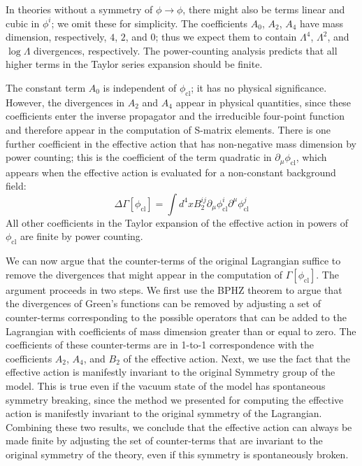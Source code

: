 In theories without a symmetry of $\phi \to \phi$, there might also be terms linear and cubic in $\phi^i$; we omit these for simplicity. The coefficients $A_0$, $A_2$, $A_4$ have mass dimension, respectively, $4$, $2$, and $0$; thus we expect them to contain $\Lambda^4$, $\Lambda^2$, and $\log \Lambda$ divergences, respectively. The power-counting analysis predicts that all higher terms in the Taylor series expansion should be finite.

The constant term $A_0$ is independent of $\phi_{\mathrm{cl}}$; it has no physical significance. However, the divergences in $A_2$ and $A_4$ appear in physical quantities, since these coefficients enter the inverse propagator and the irreducible four-point function and therefore appear in the computation of S-matrix elements. There is one further coefficient in the effective action that has non-negative mass dimension by power counting; this is the coefficient of the term quadratic in $\partial_{\mu} \phi_{\mathrm{cl}}$, which appears when the effective action is evaluated for a non-constant background field:
\[\Delta \Gamma [\phi_{\mathrm{cl}}] = \int d^4x B_2^{ij} \partial_{\mu} \phi_{\mathrm{cl}}^i \partial^{\mu} \phi_{\mathrm{cl}}^j\]
All other coefficients in the Taylor expansion of the effective action in powers of $\phi_{\mathrm{cl}}$ are finite by power counting.

We can now argue that the counter-terms of the original Lagrangian suffice to remove the divergences that might appear in the computation of $\Gamma[\phi_{\mathrm{cl}}]$. The argument proceeds in two steps. We first use the BPHZ theorem to argue that the divergences of Green's functions can be removed by adjusting a set of counter-terms corresponding to the possible operators that can be added to the Lagrangian with coefficients of mass dimension greater than or equal to zero. The coefficients of these counter-terms are in 1-to-1 correspondence with the coefficients $A_2$, $A_4$, and $B_2$ of the effective action. Next, we use the fact that the effective action is manifestly invariant to the original Symmetry group of the model. This is true even if the vacuum state of the model has spontaneous symmetry breaking, since the method we presented for computing the effective action is manifestly invariant to the original symmetry of the Lagrangian. Combining these two results, we conclude that the effective action can always be made finite by adjusting the set of counter-terms that are invariant to the original symmetry of the theory, even if this symmetry is spontaneously broken.

